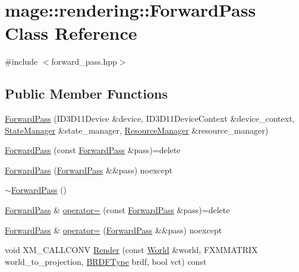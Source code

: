 \hypertarget{classmage_1_1rendering_1_1_forward_pass}{}\section{mage\+:\+:rendering\+:\+:Forward\+Pass Class Reference}
\label{classmage_1_1rendering_1_1_forward_pass}


{\ttfamily \#include $<$forward\+\_\+pass.\+hpp$>$}

\subsection*{Public Member Functions}
\begin{DoxyCompactItemize}
\item 
\hyperlink{classmage_1_1rendering_1_1_forward_pass_aabff6394203f0927f65cd9d591eefa58}{Forward\+Pass} (I\+D3\+D11\+Device \&device, I\+D3\+D11\+Device\+Context \&device\+\_\+context, \hyperlink{classmage_1_1rendering_1_1_state_manager}{State\+Manager} \&state\+\_\+manager, \hyperlink{classmage_1_1rendering_1_1_resource_manager}{Resource\+Manager} \&resource\+\_\+manager)
\item 
\hyperlink{classmage_1_1rendering_1_1_forward_pass_a5454d208d794e9ef2ae05c03e7b839fd}{Forward\+Pass} (const \hyperlink{classmage_1_1rendering_1_1_forward_pass}{Forward\+Pass} \&pass)=delete
\item 
\hyperlink{classmage_1_1rendering_1_1_forward_pass_a5f7026d7b4a439bdbacfeaf8fff152c1}{Forward\+Pass} (\hyperlink{classmage_1_1rendering_1_1_forward_pass}{Forward\+Pass} \&\&pass) noexcept
\item 
\hyperlink{classmage_1_1rendering_1_1_forward_pass_a9fdcc7dca5097f0feff2f7be92a2727c}{$\sim$\+Forward\+Pass} ()
\item 
\hyperlink{classmage_1_1rendering_1_1_forward_pass}{Forward\+Pass} \& \hyperlink{classmage_1_1rendering_1_1_forward_pass_a373b424f52fb5a209bed756dc06f47ee}{operator=} (const \hyperlink{classmage_1_1rendering_1_1_forward_pass}{Forward\+Pass} \&pass)=delete
\item 
\hyperlink{classmage_1_1rendering_1_1_forward_pass}{Forward\+Pass} \& \hyperlink{classmage_1_1rendering_1_1_forward_pass_aba2191f3e482d2fb0db2ad2cab77c817}{operator=} (\hyperlink{classmage_1_1rendering_1_1_forward_pass}{Forward\+Pass} \&\&pass) noexcept
\item 
void X\+M\+\_\+\+C\+A\+L\+L\+C\+O\+NV \hyperlink{classmage_1_1rendering_1_1_forward_pass_aaccf1f80482fb4f78376b997005c5d4a}{Render} (const \hyperlink{classmage_1_1rendering_1_1_world}{World} \&world, F\+X\+M\+M\+A\+T\+R\+IX world\+\_\+to\+\_\+projection, \hyperlink{namespacemage_1_1rendering_a13c5e70586af4ce254146074ec055bf6}{B\+R\+D\+F\+Type} brdf, bool vct) const

\end{DoxyCompactItemize}
